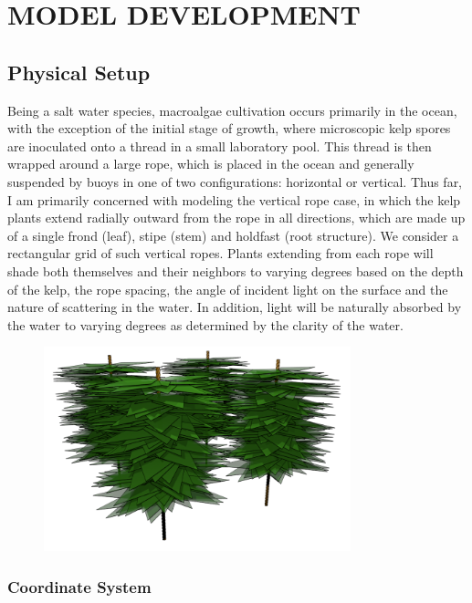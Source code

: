 \chapter{MODEL DEVELOPMENT} \label{label:modeldevelopment}

\graphicspath{{./figures/}}

\section{Physical Setup}
Being a salt water species, macroalgae cultivation occurs primarily in the ocean, with the exception of the initial stage of growth, where microscopic kelp spores are inoculated onto a thread in a small laboratory pool.
This thread is then wrapped around a large rope, which is placed in the ocean and generally suspended by buoys in one of two configurations: horizontal or vertical.
Thus far, I am primarily concerned with modeling the vertical rope case, in which the kelp plants extend radially outward from the rope in all directions, which are made up of a single frond (leaf), stipe (stem) and holdfast (root structure).
We consider a rectangular grid of such vertical ropes. 
Plants extending from each rope will shade both themselves and their neighbors
to varying degrees based on the depth of the kelp, the rope spacing, the angle
of incident light on the surface and the nature of scattering in the water.
In addition, light will be naturally absorbed by the water to varying degrees as determined by the clarity of the water.

\begin{figure}[H]
	\centering
	\includegraphics[width=3.5in]{kelp_array}
\end{figure}
\subsection{Coordinate System}

